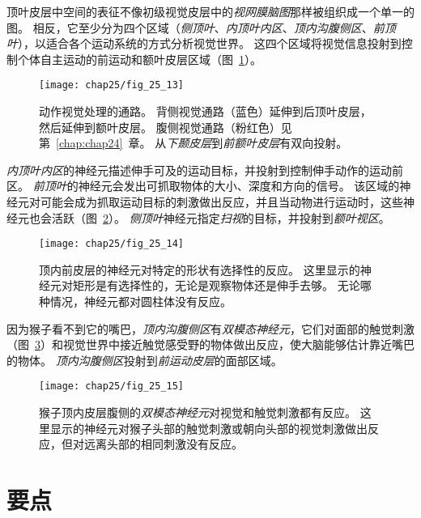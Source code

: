 顶叶皮层中空间的表征不像初级视觉皮层中的\textit{视网膜脑图}那样被组织成一个单一的图。
相反，它至少分为四个区域（\textit{侧顶叶}、\textit{内顶叶内区}、\textit{顶内沟腹侧区}、\textit{前顶叶}），以适合各个运动系统的方式分析视觉世界。
这四个区域将视觉信息投射到控制个体自主运动的前运动和额叶皮层区域（图~\ref{fig:25_13}）。


\begin{figure}[htbp]
	\centering
	\texttt{[image: chap25/fig\_25\_13]}
	\caption{动作视觉处理的通路。
		背侧视觉通路（蓝色）延伸到后顶叶皮层，然后延伸到额叶皮层。
		腹侧视觉通路（粉红色）见第~\ref{chap:chap24}~章。
		从\textit{下颞皮层}到\textit{前额叶皮层}有双向投射。}
	\label{fig:25_13}
\end{figure}


\textit{内顶叶内区}的神经元描述伸手可及的运动目标，并投射到控制伸手动作的运动前区。
\textit{前顶叶}的神经元会发出可抓取物体的大小、深度和方向的信号。
该区域的神经元对可能会成为抓取运动目标的刺激做出反应，并且当动物进行运动时，这些神经元也会活跃（图~\ref{fig:25_14}）。
\textit{侧顶叶}神经元指定\textit{扫视}的目标，并投射到\textit{额叶视区}。


\begin{figure}[htbp]
	\centering
	\texttt{[image: chap25/fig\_25\_14]}
	\caption{顶内前皮层的神经元对特定的形状有选择性的反应。
		这里显示的神经元对矩形是有选择性的，无论是观察物体还是伸手去够。
		无论哪种情况，神经元都对圆柱体没有反应。}
	\label{fig:25_14}
\end{figure}


因为猴子看不到它的嘴巴，\textit{顶内沟腹侧区}有\textit{双模态神经元}，它们对面部的触觉刺激（图~\ref{fig:25_15}）和视觉世界中接近触觉感受野的物体做出反应，使大脑能够估计靠近嘴巴的物体。
\textit{顶内沟腹侧区}投射到\textit{前运动皮层}的面部区域。


\begin{figure}[htbp]
	\centering
	\texttt{[image: chap25/fig\_25\_15]}
	\caption{猴子顶内皮层腹侧的\textit{双模态神经元}对视觉和触觉刺激都有反应。
		这里显示的神经元对猴子头部的触觉刺激或朝向头部的视觉刺激做出反应，但对远离头部的相同刺激没有反应。}
	\label{fig:25_15}
\end{figure}



\section{要点}

